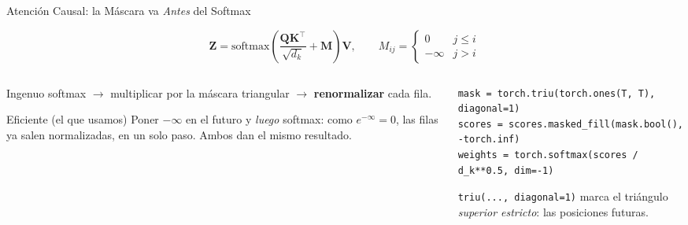 \documentclass[aspectratio=169, 10pt]{beamer}
\newcommand{\softmax}{\mathrm{softmax}}
\newcommand{\formula}[1]{%
	\begin{tcolorbox}[colback=UCMBlue!8, colframe=UCMBlue, arc=4pt,
		boxsep=2pt, left=6pt, right=6pt, top=3pt, bottom=3pt]
		#1
	\end{tcolorbox}
}
\begin{document}
\begin{frame}[fragile]{Atenci\'on Causal: la M\'ascara va \emph{Antes} del Softmax}
	\formula{
		\small
		\[
		\mathbf{Z}=\softmax\!\left(\frac{\mathbf{Q}\mathbf{K}^\top}{\sqrt{d_k}}+\mathbf{M}\right)\mathbf{V},
		\qquad
		M_{ij}=\begin{cases}0 & j\le i\\ -\infty & j>i\end{cases}
		\]
	}
	\vspace{-0.1cm}
	\begin{columns}[T]
		\begin{column}{0.5\textwidth}
			\begin{block}{Ingenuo}
				\small
				softmax $\to$ multiplicar por la m\'ascara triangular $\to$ \textbf{renormalizar} cada fila.
			\end{block}
			\begin{block}{Eficiente (el que usamos)}
				\small
				Poner $-\infty$ en el futuro y \emph{luego} softmax: como $e^{-\infty}=0$, las filas ya salen normalizadas, en un solo paso. Ambos dan el mismo resultado.
			\end{block}
		\end{column}
		\begin{column}{0.5\textwidth}
			\scriptsize
			\begin{tcolorbox}[colback=LightGray, colframe=UCMNavy, arc=3pt, boxsep=1pt]
\begin{verbatim}
mask = torch.triu(torch.ones(T, T), diagonal=1)
scores = scores.masked_fill(mask.bool(), -torch.inf)
weights = torch.softmax(scores / d_k**0.5, dim=-1)
\end{verbatim}
			\end{tcolorbox}
			\small
			\texttt{triu(..., diagonal=1)} marca el tri\'angulo \emph{superior estricto}: las posiciones futuras.
		\end{column}
	\end{columns}
\end{frame}
\end{document}
